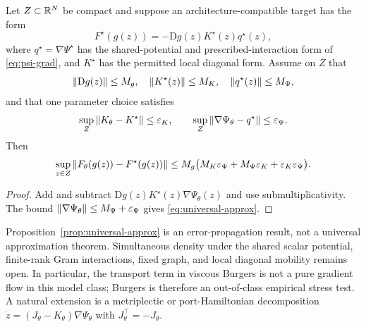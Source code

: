 \begin{proposition}\label{prop:universal-approx}
Let $Z\subset\mathbb{R}^N$ be compact and suppose an architecture-compatible target has the form
\begin{equation*}
F^\star(g(z))=-\mathrm{D}g(z)K^\star(z)q^\star(z),
\end{equation*}
where $q^\star=\nabla\Psi^\star$ has the shared-potential and prescribed-interaction form of \eqref{eq:psi-grad}, and $K^\star$ has the permitted local diagonal form. Assume on $Z$ that
\begin{equation*}
\left\lVert \mathrm{D}g(z) \right\rVert\le M_g,\quad
\left\lVert K^\star(z) \right\rVert\le M_K,\quad
\left\lVert q^\star(z) \right\rVert\le M_\Psi,
\end{equation*}
and that one parameter choice satisfies
\begin{equation*}
\sup_Z\left\lVert K_\theta-K^\star \right\rVert\le\varepsilon_K,
\qquad
\sup_Z\left\lVert \nabla\Psi_\theta-q^\star \right\rVert\le\varepsilon_\Psi.
\end{equation*}
Then
\begin{equation}\label{eq:universal-approx}
\sup_{z\in Z}\left\lVert F_\theta(g(z))-F^\star(g(z)) \right\rVert
\le M_g\bigl(M_K\varepsilon_\Psi+M_\Psi\varepsilon_K
+\varepsilon_K\varepsilon_\Psi\bigr).
\end{equation}
\end{proposition}

\begin{proof}
Add and subtract $\mathrm{D}g(z)K^\star(z)\nabla\Psi_\theta(z)$ and use submultiplicativity. The bound $\left\lVert \nabla\Psi_\theta \right\rVert\le M_\Psi+\varepsilon_\Psi$ gives \eqref{eq:universal-approx}.
\end{proof}

\begin{remark}\label{rem:ua-scope}
Proposition~\ref{prop:universal-approx} is an error-propagation result, not a universal approximation theorem. Simultaneous density under the shared scalar potential, finite-rank Gram interactions, fixed graph, and local diagonal mobility remains open. In particular, the transport term in viscous Burgers is not a pure gradient flow in this model class; Burgers is therefore an out-of-class empirical stress test. A natural extension is a metriplectic or port-Hamiltonian decomposition $\dot z=(J_\theta-K_\theta)\nabla\Psi_\theta$ with $J_\theta^\top=-J_\theta$.
\end{remark}


